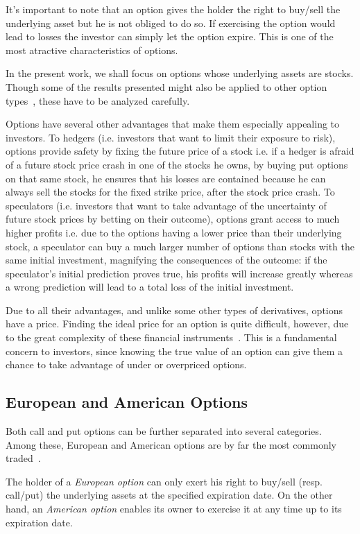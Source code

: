 \documentclass[a4paper,twocolumn,aps,prd,longbibliography,superscriptaddress]{revtex4-1}
\begin{document}
It's important to note that an option gives the holder the right to buy/sell the underlying asset but he is not obliged to do so. If exercising the option would lead to losses the investor can simply let the option expire. This is one of the most atractive characteristics of options.

In the present work, we shall focus on options whose underlying assets are stocks. Though some of the results presented might also be applied to other option types~\cite{Hull}, these have to be analyzed carefully.


Options have several other advantages that make them especially appealing to investors.
To hedgers (i.e. investors that want to limit their exposure to risk), options provide safety by fixing the future price of a stock i.e. if a hedger is afraid of a future stock price crash in one of the stocks he owns, by buying put options on that same stock, he ensures that his losses are contained because he can always sell the stocks for the fixed strike price, after the stock price crash.
To speculators (i.e. investors that want to take advantage of the uncertainty of future stock prices by betting on their outcome), options grant access to much higher profits i.e. due to the options having a lower price than their underlying stock, a speculator can buy a much larger number of options than stocks with the same initial investment, magnifying the consequences of the outcome: if the speculator's initial prediction proves true, his profits will increase greatly whereas a wrong prediction will lead to a total loss of the initial investment.

Due to all their advantages, and unlike some other types of derivatives, options have a price. Finding the ideal price for an option is quite difficult, however, due to the great complexity of these financial instruments~\cite{Wilmott1}. This is a fundamental concern to investors, since knowing the true value of an option can give them a chance to take advantage of under or overpriced options.




\subsection{European and American Options}
Both call and put options can be further separated into several categories. Among these, European and American options are by far the most commonly traded~\cite{Hull}.

The holder of a \textit{European option} can only exert his right to buy/sell (resp. call/put) the underlying assets at the specified expiration date.
On the other hand, an \textit{American option} enables its owner to exercise it at any time up to its expiration date.
\end{document}
